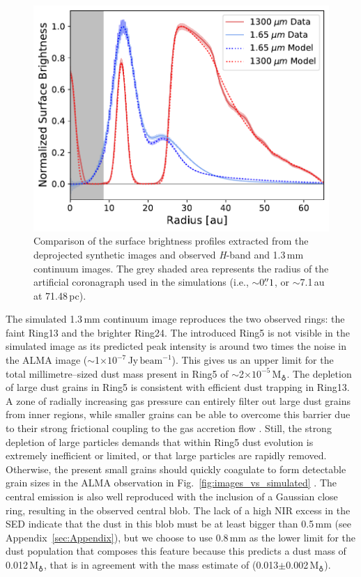 \documentclass[fleqn,usenatbib,useAMS]{mnras}
\begin{document}
\begin{figure}
	\includegraphics[width=\columnwidth]{comp_fig_all_profiles_au.pdf}
    \caption{Comparison of the surface brightness profiles extracted from the deprojected synthetic images and observed \textit{H}-band and 1.3\,mm continuum images. The grey shaded area represents the radius of the artificial coronagraph used in the simulations (i.e., $\sim$0$\hbox{$.\!\!^{\prime\prime}$} 1$, or $\sim$7.1\,au at 71.48\,pc).}
    \label{fig:radprofiles}
\end{figure}

The simulated 1.3\,mm continuum image reproduces the two observed rings: the faint Ring13 and the brighter Ring24. The introduced Ring5 is not visible in the simulated image as its predicted peak intensity is around two times the noise in the ALMA image ($\sim$1$\times10^{-7}$\,Jy\,$\mathrm{beam}^{-1}$). This gives us an upper limit for the total millimetre--sized dust mass present in Ring5 of $\sim$2$\times10^{-5}$\,M$_{\earth}$. The depletion of large dust grains in Ring5 is consistent with efficient dust trapping in Ring13. A zone of radially increasing gas pressure can entirely filter out large dust grains from inner regions, while smaller grains can be able to overcome this barrier due to their strong frictional coupling to the gas accretion flow \citep[studied in the context of planetary gaps,][]{Rice2006,Zhu2012,Weber2018}. Still, the strong depletion of large particles demands that within Ring5 dust evolution is extremely inefficient or limited, or that large particles are rapidly removed. Otherwise, the present small grains should quickly coagulate to form detectable grain sizes in the ALMA observation in Fig.~\ref{fig:images_vs_simulated} \citep{Drazkowska2019}. The central emission is also well reproduced with the inclusion of a Gaussian close ring, resulting in the observed central blob. The lack of a high NIR excess in the SED indicate that the dust in this blob must be at least bigger than 0.5\,mm (see Appendix~\ref{sec:Appendix}), but we choose to use 0.8\,mm as the lower limit for the dust population that composes this feature because this predicts a dust mass of 0.012\,M$_{\earth}$, that is in agreement with the mass estimate of \citet{Francis_2020} (0.013$\pm$0.002\,M$_{\earth}$). 
\end{document}
